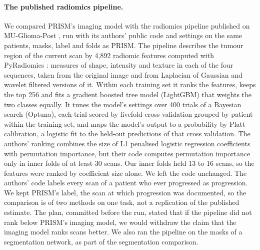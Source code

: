 \paragraph*{The published radiomics pipeline.} We compared PRISM's imaging model with the radiomics pipeline published
on MU-Glioma-Post \citep{christodoulou2026}, run with its authors' public code and settings on the same patients,
masks, label and folds as PRISM. The pipeline describes the tumour region of the current scan by 4,892 radiomic
features computed with PyRadiomics \citep{vangriethuysen2017}: measures of shape, intensity and texture in each of the
four sequences, taken from the original image and from Laplacian of Gaussian and wavelet filtered versions of it.
Within each training set it ranks the features, keeps the top 256 and fits a gradient boosted tree model (LightGBM)
that weights the two classes equally. It tunes the model's settings over 400 trials of a Bayesian search (Optuna),
each trial scored by fivefold cross validation grouped by patient within the training set, and maps the model's
output to a probability by Platt calibration, a logistic fit to the held-out predictions of that cross validation.
The authors' ranking combines the size of L1 penalised logistic regression coefficients with permutation importance,
but their code computes permutation importance only in inner folds of at least 30 scans. Our inner folds held 13 to 16
scans, so the features were ranked by coefficient size alone. We left the code unchanged.
The authors' code labels every scan of a patient who ever progressed as progression. We kept PRISM's label, the scan
at which progression was documented, so the comparison is of two methods on one task, not a replication of the
published estimate. The plan, committed before the run, stated that if the pipeline did not rank below PRISM's
imaging model, we would withdraw the claim that the imaging model ranks scans better. We also ran the pipeline on the
masks of a segmentation network, as part of the segmentation comparison.

